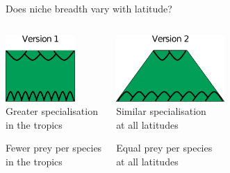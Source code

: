 \documentclass{beamer}
\begin{document}
  \begin{frame}{Does niche breadth vary with latitude?}
    \begin{columns}
    \column{.5in}
    \column{1.75in}
      \begin{center}
      \includegraphics[height=1in]{Figures/version1.eps}\\
      \vspace{.5cm}
      Greater specialisation\\in the tropics

      \vspace{.25cm}
      Fewer prey per species\\in the tropics

      \end{center}
    \column{.5in}
    \column{1.75in}
      \begin{center}
      \includegraphics[height=1in]{Figures/version2.eps}\\
      \vspace{.5cm}
      Similar specialisation\\at all latitudes

      \vspace{.25cm}
      Equal prey per species\\at all latitudes

      \end{center}
    \column{.5in}
    \end{columns}

  \end{frame}
\end{document}
